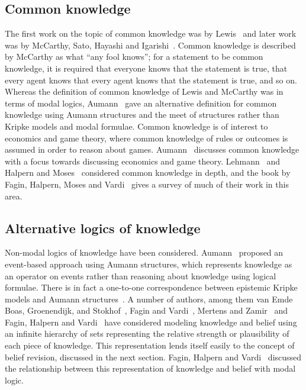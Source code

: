 \subsection{Common knowledge}

The first work on the topic of common knowledge was by Lewis~\cite{lewis:1969}
and later work was by McCarthy, Sato, Hayashi and Igarishi~\cite{mccarthy:1979}.
Common knowledge is described by McCarthy as what ``any fool knows''; for a
statement to be common knowledge, it is required that everyone knows that the
statement is true, that every agent knows that every agent knows that the
statement is true, and so on. Whereas the definition of common knowledge of
Lewis and McCarthy was in terms of modal logics, Aumann~\cite{aumann:1976} gave
an alternative definition for common knowledge using Aumann structures and the
meet of structures rather than Kripke models and modal formulae. Common
knowledge is of interest to economics and game theory, where common knowledge of
rules or outcomes is assumed in order to reason about games.
Aumann~\cite{aumann:1976} discusses common knowledge with a focus towards
discussing economics and game theory.  Lehmann~\cite{lehmann:1984} and Halpern
and Moses~\cite{halpern:1985} considered common knowledge in depth, and the book
by Fagin, Halpern, Moses and Vardi~\cite{fagin:1995} gives a survey of much of
their work in this area.

\subsection{Alternative logics of knowledge}

Non-modal logics of knowledge have been considered.  Aumann~\cite{aumann:1976}
proposed an event-based approach using Aumann structures, which represents
knowledge as an operator on events rather than reasoning about knowledge using
logical formulae. There is in fact a one-to-one correspondence between epistemic
Kripke models and Aumann structures~\cite{fagin:1995}. A number of authors, among
them van Emde Boas, Groenendijk, and Stokhof~\cite{vanemdeboas:1980}, Fagin and
Vardi~\cite{fagin:1985}, Mertens and Zamir~\cite{mertens:1985} and Fagin, Halpern
and Vardi~\cite{fagin:1991} have considered modeling knowledge and belief using
an infinite hierarchy of sets representing the relative strength or plausibility
of each piece of knowledge. This representation lends itself easily to the
concept of belief revision, discussed in the next section. Fagin, Halpern and
Vardi~\cite{fagin:1991} discussed the relationship between this representation
of knowledge and belief with modal logic.

